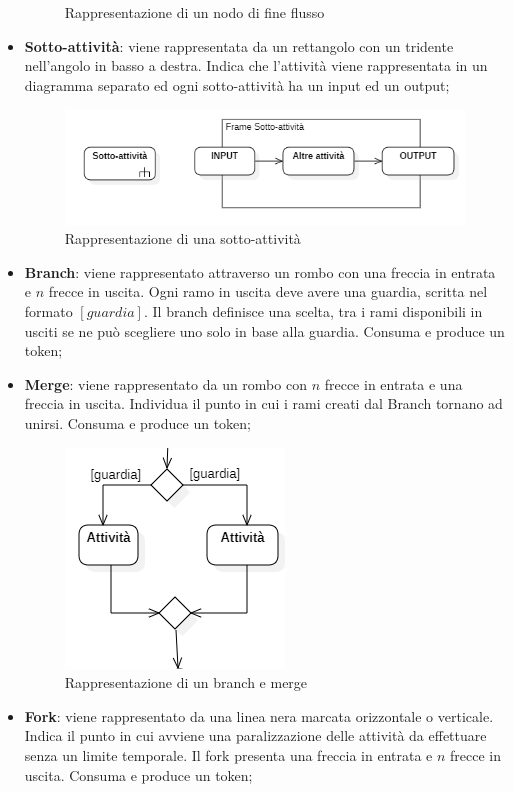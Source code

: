 \begin{itemize}
\begin{figure}[H]
		\caption{Rappresentazione di un nodo di fine flusso}
	\end{figure}
	\item \textbf{Sotto-attività}: viene rappresentata da un rettangolo con un tridente nell'angolo in basso a destra. Indica che l'attività viene rappresentata in un diagramma separato ed ogni sotto-attività ha un input ed un output;
	\begin{figure}[H]
		\centering\includegraphics{../immagini/normeUML/attSott.png}
		\caption{Rappresentazione di una sotto-attività}
	\end{figure}
	\item \textbf{Branch}: viene rappresentato attraverso un rombo con una freccia in entrata e $n$ frecce in uscita. Ogni ramo in uscita deve avere una guardia, scritta nel formato $[guardia]$. Il branch definisce una scelta, tra i rami disponibili in usciti se ne può scegliere uno solo in base alla guardia. Consuma e produce un token;
	\item \textbf{Merge}: viene rappresentato da un rombo con $n$ frecce in entrata e una freccia in uscita. Individua il punto in cui i rami creati dal Branch tornano ad unirsi. Consuma e produce un token;
		\begin{figure}[H]
		\centering\includegraphics{../immagini/normeUML/mergeBranch.png}
		\caption{Rappresentazione di un branch e merge}
	\end{figure}
	\item \textbf{Fork}: viene rappresentato da una linea nera marcata orizzontale o verticale. Indica il punto in cui avviene una paralizzazione delle attività da effettuare senza un limite temporale. Il fork presenta una freccia in entrata e $n$ frecce in uscita. Consuma e produce un token;

\end{itemize}
